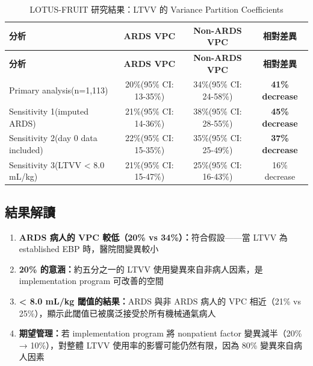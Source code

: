 \documentclass[12pt,a4paper]{article}
\begin{document}
\begin{longtable}{p{4cm}ccc}
\caption{LOTUS-FRUIT 研究結果：LTVV 的 Variance Partition Coefficients} \\
\toprule
\textbf{分析} & \textbf{ARDS VPC} & \textbf{Non-ARDS VPC} & \textbf{相對差異} \\
\midrule
\endfirsthead

\toprule
\textbf{分析} & \textbf{ARDS VPC} & \textbf{Non-ARDS VPC} & \textbf{相對差異} \\
\midrule
\endhead

\bottomrule
\endfoot

Primary analysis\newline (n=1,113) & 20\%\newline (95\% CI: 13-35\%) & 34\%\newline (95\% CI: 24-58\%) & \textbf{41\% decrease} \\
\midrule
Sensitivity 1\newline (imputed ARDS) & 21\%\newline (95\% CI: 14-36\%) & 38\%\newline (95\% CI: 28-55\%) & \textbf{45\% decrease} \\
\midrule
Sensitivity 2\newline (day 0 data included) & 22\%\newline (95\% CI: 15-35\%) & 35\%\newline (95\% CI: 25-49\%) & \textbf{37\% decrease} \\
\midrule
Sensitivity 3\newline (LTVV < 8.0 mL/kg) & 21\%\newline (95\% CI: 15-47\%) & 25\%\newline (95\% CI: 16-43\%) & 16\% decrease \\
\bottomrule
\end{longtable}

\subsection{結果解讀}

\begin{tcolorbox}[colback=emergency_blue!5!white,colframe=emergency_blue,title=\textbf{重點解讀}]
\begin{enumerate}
    \item \textbf{ARDS 病人的 VPC 較低（20\% vs 34\%）：}符合假設——當 LTVV 為 established EBP 時，醫院間變異較小

    \item \textbf{20\% 的意涵：}約五分之一的 LTVV 使用變異來自非病人因素，是 implementation program 可改善的空間

    \item \textbf{< 8.0 mL/kg 閾值的結果：}ARDS 與非 ARDS 病人的 VPC 相近（21\% vs 25\%），顯示此閾值已被廣泛接受於所有機械通氣病人

    \item \textbf{期望管理：}若 implementation program 將 nonpatient factor 變異減半（20\% → 10\%），對整體 LTVV 使用率的影響可能仍然有限，因為 80\% 變異來自病人因素
\end{enumerate}
\end{tcolorbox}
\end{document}
